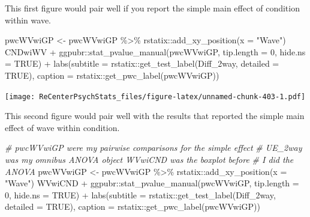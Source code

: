\documentclass[
  11pt,
]{book}
\newenvironment{Shaded}{\begin{snugshade}}{\end{snugshade}}
\newcommand{\AttributeTok}[1]{\textcolor[rgb]{0.77,0.63,0.00}{#1}}
\newcommand{\CommentTok}[1]{\textcolor[rgb]{0.56,0.35,0.01}{\textit{#1}}}
\newcommand{\ConstantTok}[1]{\textcolor[rgb]{0.00,0.00,0.00}{#1}}
\newcommand{\DecValTok}[1]{\textcolor[rgb]{0.00,0.00,0.81}{#1}}
\newcommand{\FunctionTok}[1]{\textcolor[rgb]{0.00,0.00,0.00}{#1}}
\newcommand{\NormalTok}[1]{#1}
\newcommand{\OtherTok}[1]{\textcolor[rgb]{0.56,0.35,0.01}{#1}}
\newcommand{\SpecialCharTok}[1]{\textcolor[rgb]{0.00,0.00,0.00}{#1}}
\newcommand{\StringTok}[1]{\textcolor[rgb]{0.31,0.60,0.02}{#1}}
\begin{document}
This first figure would pair well if you report the simple main effect of condition within wave.

\begin{Shaded}
\begin{Highlighting}[]
\NormalTok{pwcWVwiGP }\OtherTok{\textless{}{-}}\NormalTok{ pwcWVwiGP }\SpecialCharTok{\%\textgreater{}\%}
\NormalTok{    rstatix}\SpecialCharTok{::}\FunctionTok{add\_xy\_position}\NormalTok{(}\AttributeTok{x =} \StringTok{"Wave"}\NormalTok{)}
\NormalTok{CNDwiWV }\SpecialCharTok{+}\NormalTok{ ggpubr}\SpecialCharTok{::}\FunctionTok{stat\_pvalue\_manual}\NormalTok{(pwcWVwiGP, }\AttributeTok{tip.length =} \DecValTok{0}\NormalTok{, }\AttributeTok{hide.ns =} \ConstantTok{TRUE}\NormalTok{) }\SpecialCharTok{+}
    \FunctionTok{labs}\NormalTok{(}\AttributeTok{subtitle =}\NormalTok{ rstatix}\SpecialCharTok{::}\FunctionTok{get\_test\_label}\NormalTok{(Diff\_2way, }\AttributeTok{detailed =} \ConstantTok{TRUE}\NormalTok{),}
        \AttributeTok{caption =}\NormalTok{ rstatix}\SpecialCharTok{::}\FunctionTok{get\_pwc\_label}\NormalTok{(pwcWVwiGP))}
\end{Highlighting}
\end{Shaded}

\texttt{[image: ReCenterPsychStats\_files/figure-latex/unnamed-chunk-403-1.pdf]}

This second figure would pair well with the results that reported the simple main effect of wave within condition.

\begin{Shaded}
\begin{Highlighting}[]
\CommentTok{\# pwcWVwiGP were my pairwise comparisons for the simple effect}
\CommentTok{\# UE\_2way was my omnibus ANOVA object WVwiCND was the boxplot before}
\CommentTok{\# I did the ANOVA}
\NormalTok{pwcWVwiGP }\OtherTok{\textless{}{-}}\NormalTok{ pwcWVwiGP }\SpecialCharTok{\%\textgreater{}\%}
\NormalTok{    rstatix}\SpecialCharTok{::}\FunctionTok{add\_xy\_position}\NormalTok{(}\AttributeTok{x =} \StringTok{"Wave"}\NormalTok{)}
\NormalTok{WVwiCND }\SpecialCharTok{+}\NormalTok{ ggpubr}\SpecialCharTok{::}\FunctionTok{stat\_pvalue\_manual}\NormalTok{(pwcWVwiGP, }\AttributeTok{tip.length =} \DecValTok{0}\NormalTok{, }\AttributeTok{hide.ns =} \ConstantTok{TRUE}\NormalTok{) }\SpecialCharTok{+}
    \FunctionTok{labs}\NormalTok{(}\AttributeTok{subtitle =}\NormalTok{ rstatix}\SpecialCharTok{::}\FunctionTok{get\_test\_label}\NormalTok{(Diff\_2way, }\AttributeTok{detailed =} \ConstantTok{TRUE}\NormalTok{),}
        \AttributeTok{caption =}\NormalTok{ rstatix}\SpecialCharTok{::}\FunctionTok{get\_pwc\_label}\NormalTok{(pwcWVwiGP))}
\end{Highlighting}
\end{Shaded}
\end{document}
